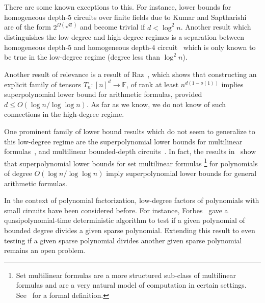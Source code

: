 \documentclass{toc}
\newcommand{\F}{\mathbb{F}}
\begin{document}
There are some known exceptions to this. For instance, lower bounds for homogeneous depth-$5$ circuits over finite fields due to Kumar and Saptharishi~\cite{KumarSapth15} are of the form $2^{\Omega(\sqrt{d})}$ and become trivial if $d < \log^2 n$. Another result which distinguishes the low-degree and high-degree
%
regimes   %
is a separation between homogeneous depth-$5$ and homogeneous depth-$4$ circuit~\cite{KumarSapth15} which is only known to be true in the low-degree regime (degree less than $\log^2 n$).

Another result of relevance is a result of Raz~\cite{raz10}, which shows that constructing an explicit family of 
tensors $T_n:[n]^d \rightarrow \F$, of rank at least $n^{d(1-o(1))}$ implies
%
superpolynomial   %
lower bound for arithmetic formulas, provided $d \leq O(\log n/\log\log n)$. As far as we know, we do not know of such connections in the
%
high-degree regime.    %

One prominent family of lower bound results which do not seem to
generalize to this low-degree regime are the
%
superpolynomial   %
lower bounds for multilinear formulas~\cite{Raz06}, and multilinear
%
bounded-depth     %
circuits~\cite{raz-yehudayoff}. In fact, the results in~\cite{raz10} show that %
superpolynomial   %
lower bounds for set multilinear formulas%
\footnote{Set multilinear formulas are a more structured sub-class of multilinear formulas and are a very natural model of computation in certain settings. See~\cite{raz10} for a formal definition.}
%
%
%
for polynomials of degree %
$O(\log n/\log\log n)$
%
imply   %
%
superpolynomial   %
lower bounds for general arithmetic formulas. 

In the context of polynomial factorization, low-degree factors of polynomials with small circuits have been considered before. For instance, Forbes~\cite{Forbes15} gave a 
%
quasipolynomial-time  %
deterministic algorithm to test if a given polynomial of
%
bounded     %
degree divides a given sparse polynomial. Extending this result to even testing if a given sparse polynomial divides another given sparse polynomial remains an open problem. 

%
\end{document}
